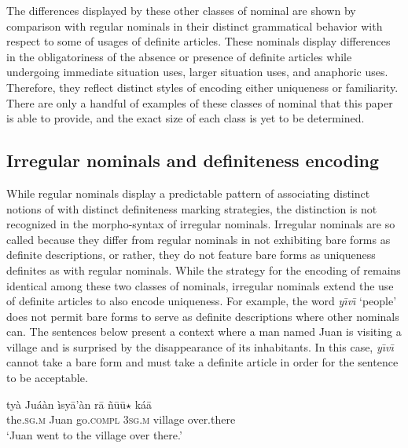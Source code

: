 \documentclass[output=paper,modfonts,nonflat]{langsci/langscibook}
\begin{document}
The differences displayed by these other classes of nominal are shown by comparison with regular nominals in their distinct grammatical behavior with respect to some of  usages of definite articles.  These nominals display differences in the obligatoriness of the absence or presence of definite articles while undergoing immediate situation uses, larger situation uses, and anaphoric uses.  Therefore, they reflect distinct styles of encoding either uniqueness or familiarity.  There are only a handful of examples of these classes of nominal that this paper is able to provide, and the exact size of each class is yet to be determined.

\subsection{Irregular nominals and definiteness encoding} \label{sec:cisneros:5.1}

While regular nominals display a predictable pattern of associating distinct notions of  with distinct definiteness marking strategies, the distinction is not recognized in the morpho-syntax of irregular nominals.  Irregular nominals are so called because they differ from regular nominals in not exhibiting bare forms as definite descriptions, or rather, they do not feature bare forms as uniqueness definites as with regular nominals.  While the strategy for the encoding of  remains identical among these two classes of nominals, irregular nominals extend the use of definite articles to also encode uniqueness.  For example, the word \textit{y\=\i v\=\i} `people' does not permit bare forms to serve as definite descriptions where other nominals can.  The sentences below present a context where a man named Juan is visiting a village and is surprised by the disappearance of its inhabitants.  In this case, \textit{y\=\i v\=\i} cannot take a bare form and must take a definite article in order for the sentence to be acceptable.

\ea {}\label{ex:cisneros:73}
\gll
{\ob}ty\`a Ju\'a\`an{\cb} \`isy\=a'\`an r\=a {\ob}\~n\=u\=u$\star$ k\'a\=a{\cb}\\
{\db}the.\textsc{sg.m} Juan go.\textsc{compl} 3\textsc{sg.m} {\db}village over.there\\
\glt
`Juan went to the village over there.'
\end{document}
